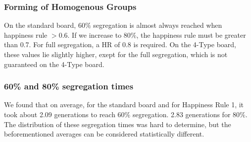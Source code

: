 \subsubsection*{Forming of Homogenous Groups}
On the standard board, $60\%$ segregation is almost always reached when happiness rule $>0.6$. If we increase to $80\%$, the happiness rule must be greater than 0.7. For full segregation, a HR of 0.8 is required. On the 4-Type board, these values lie slightly higher, exept for the full segregation, which is not guaranteed on the 4-Type board.

\subsubsection*{60\% and 80\% segregation times}
We found that on average, for the standard board and for Happiness Rule 1, it took about 2.09 generations to reach $60\%$ segregation. 2.83 generations for $80\%$. The distribution of these segregation times was hard to determine, but the beforementioned averages can be considered statistically different.